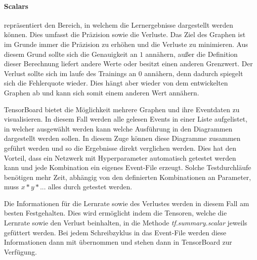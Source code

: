 \paragraph{Scalars} repräsentiert den Bereich, in welchem die Lernergebnisse dargestellt werden können. 
Dies umfasst die Präzision sowie die Verluste. 
Das Ziel des Graphen ist im Grunde immer die Präzision zu erhöhen und die Verluste zu minimieren. 
Aus diesem Grund sollte sich die Genauigkeit an $1$ annähern, außer die Definition dieser Berechnung liefert andere Werte oder besitzt einen anderen Grenzwert. 
Der Verlust sollte sich im laufe des Trainings an $0$ annähern, denn dadurch spiegelt sich die Fehlerquote wieder. 
Dies hängt aber wieder von dem entwickelten Graphen ab und kann sich somit einem anderen Wert annähern.
\phantom \newline

\noindent
TensorBoard bietet die Möglichkeit mehrere Graphen und ihre Eventdaten zu visualisieren. 
In diesem Fall werden alle gelesen Events in einer Liste aufgelistet, in welcher ausgewählt werden kann welche Ausführung in den Diagrammen dargestellt werden sollen. 
In diesem Zuge können diese Diagramme zusammen geführt werden und so die Ergebnisse direkt verglichen werden. 
Dies hat den Vorteil, dass ein Netzwerk mit Hyperparameter automatisch getestet werden kann und jede Kombination ein eigenes Event-File erzeugt. 
Solche Testdurchläufe benötigen mehr Zeit, abhängig von den definierten Kombinationen an Parameter, muss $x * y * ...$ alles durch getestet werden.
\phantom \newline

\noindent
Die Informationen für die Lernrate sowie des Verlustes werden in diesem Fall am besten Festgehalten. 
Dies wird ermöglicht indem die Tensoren, welche die Lernrate sowie den Verlust beinhalten, in die Methode \textit{tf.summary.scalar} jeweils gefüttert werden. 
Bei jedem Schreibzyklus in das Event-File werden diese Informationen dann mit übernommen und stehen dann in TensorBoard zur Verfügung.

